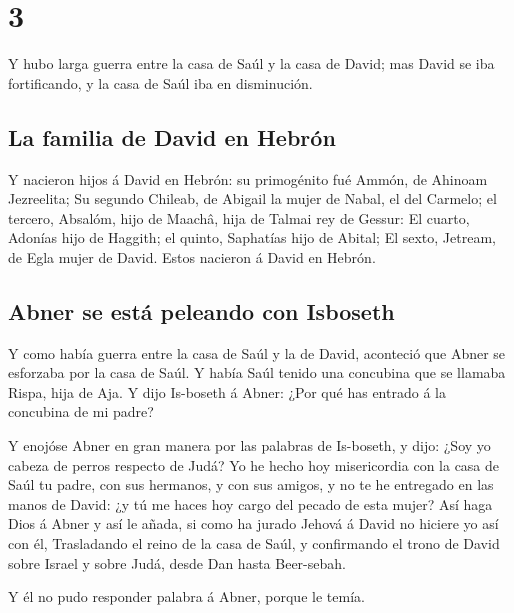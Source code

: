 \hypertarget{section-2}{%
\section{3}\label{section-2}}

 Y hubo larga guerra entre la casa de Saúl y la casa de
David; mas David se iba fortificando, y la casa de Saúl iba en
disminución.

\hypertarget{la-familia-de-david-en-hebruxf3n}{%
\subsection{La familia de David en
Hebrón}\label{la-familia-de-david-en-hebruxf3n}}

 Y nacieron hijos á David en Hebrón: su primogénito fué
Ammón, de Ahinoam Jezreelita;  Su segundo Chileab, de
Abigail la mujer de Nabal, el del Carmelo; el tercero, Absalóm, hijo de
Maachâ, hija de Talmai rey de Gessur:  El cuarto, Adonías
hijo de Haggith; el quinto, Saphatías hijo de Abital;  El
sexto, Jetream, de Egla mujer de David. Estos nacieron á David en
Hebrón.

\hypertarget{abner-se-estuxe1-peleando-con-isboseth}{%
\subsection{Abner se está peleando con
Isboseth}\label{abner-se-estuxe1-peleando-con-isboseth}}

 Y como había guerra entre la casa de Saúl y la de David,
aconteció que Abner se esforzaba por la casa de Saúl.  Y
había Saúl tenido una concubina que se llamaba Rispa, hija de Aja. Y
dijo Is-boseth á Abner: ¿Por qué has entrado á la concubina de mi padre?

 Y enojóse Abner en gran manera por las palabras de
Is-boseth, y dijo: ¿Soy yo cabeza de perros respecto de Judá? Yo he
hecho hoy misericordia con la casa de Saúl tu padre, con sus hermanos, y
con sus amigos, y no te he entregado en las manos de David: ¿y tú me
haces hoy cargo del pecado de esta mujer?  Así haga Dios á
Abner y así le añada, si como ha jurado Jehová á David no hiciere yo así
con él,  Trasladando el reino de la casa de Saúl, y
confirmando el trono de David sobre Israel y sobre Judá, desde Dan hasta
Beer-sebah.

 Y él no pudo responder palabra á Abner, porque le temía.

